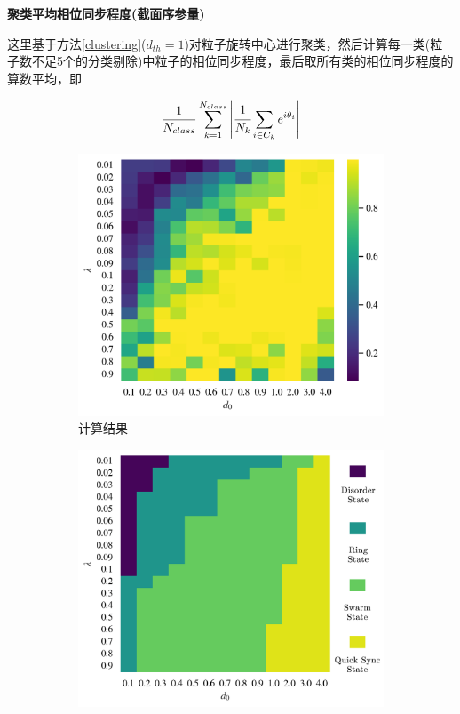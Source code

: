 \documentclass{article}
\begin{document}
\newpage
\noindent\textbf{聚类平均相位同步程度(截面序参量)}

这里基于方法\ref{clustering}($d_{th}=1$)对粒子旋转中心进行聚类，然后计算每一类(粒子数不足5个的分类剔除)中粒子的相位同步程度，最后取所有类的相位同步程度的算数平均，即

$$\frac{1}{N_{class}}\sum_{k=1}^{N_{class}}\left|\cfrac{1}{N_{k}}\sum_{i\in C_{k}}e^{i\theta_i}\right|$$

\vspace{-0.5cm}
\begin{figure}[H]
	\centering
	\begin{subfigure}[b]{0.49\textwidth}
		\includegraphics[width=\textwidth]{./figs/clusteringPhaseSync.png}
		\vspace{-1cm}
		\caption{计算结果}
	\end{subfigure}
	\begin{subfigure}[b]{0.49\textwidth}
		\includegraphics[width=\textwidth]{./figs/subjectiveOp.png}

\end{subfigure}
\end{figure}
\end{document}
